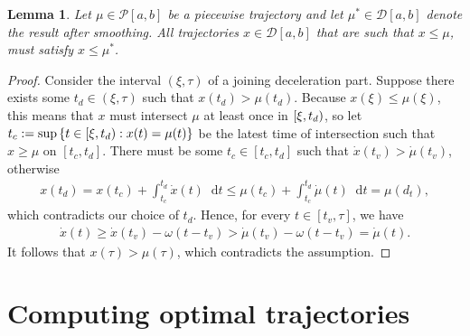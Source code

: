 \documentclass[a4paper]{article}
\theoremstyle{definition}
\theoremstyle{plain}
\newtheorem{lemma}{Lemma\hspace{0.25em}\ignorespaces}
\newcommand*\diff{\mathop{}\!\mathrm{d}}
\begin{document}
\begin{lemma}\label{lemma:upperbound}
  Let $\mu \in \mathcal{P}[a,b]$ be a piecewise trajectory and let
  $\mu^{*} \in \mathcal{D}[a,b]$ denote the result after smoothing. All
  trajectories $x \in \mathcal{D}[a, b]$ that are such that
  $x \leq \mu$, must satisfy $x \leq \mu^{*}$.
\end{lemma}
\begin{proof}
  Consider the interval $(\xi, \tau)$ of a joining deceleration part. Suppose
  there exists some $t_{d} \in (\xi, \tau)$ such that
  $x(t_{d}) > \mu(t_{d})$. Because $x(\xi) \leq \mu(\xi)$, this means
  that $x$ must intersect $\mu$ at least once in $[\xi,t_{d})$,
  so let
  $t_{c} := \sup \, \{ t \in [\xi,t_{d}) : x(t) = \mu(t) \}$ be
  the latest time of intersection such that $x \geq \mu$ on
  $[t_{c}, t_{d}]$. There must be some $t_{c} \in [t_{c}, t_{d}]$ such that
  $\dot{x}(t_{v}) > \dot{\mu}(t_{v})$, otherwise
  \begin{align*}
    x(t_{d}) = x(t_{c}) + \int_{t_{c}}^{t_{d}} \dot{x}(t) \diff t \leq \mu(t_{c}) + \int_{t_{c}}^{t_{d}} \dot{\mu}(t) \diff t = \mu(d_{t}) ,
  \end{align*}
  which contradicts our choice of $t_{d}$. Hence, for every
  $t \in [t_{v}, \tau]$, we have
  \begin{align*}
    \dot{x}(t) \geq \dot{x}(t_{v}) - \omega (t - t_{v}) > \dot{\mu}(t_{v}) - \omega(t - t_{v}) = \dot{\mu}(t) .
  \end{align*}
  It follows that $x(\tau) > \mu(\tau)$, which contradicts the assumption.
\end{proof}

\newpage
\section{Computing optimal trajectories}
\end{document}
